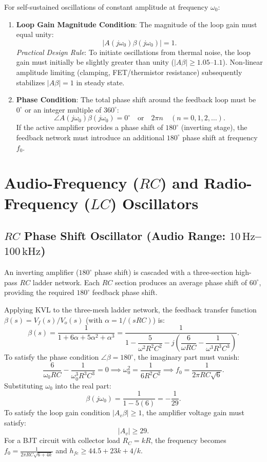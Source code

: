 \documentclass[12pt,a4paper]{article}
\begin{document}
\begin{tcolorbox}[formulabox, title={The Two Barkhausen Conditions}]
For self-sustained oscillations of constant amplitude at frequency $\omega_0$:
\begin{enumerate}[leftmargin=1.5em, itemsep=3pt]
  \item \textbf{Loop Gain Magnitude Condition}: The magnitude of the loop gain must equal unity:
  \[
  |A(j\omega_0)\beta(j\omega_0)| = 1.
  \]
  \textit{Practical Design Rule}: To initiate oscillations from thermal noise, the loop gain must initially be slightly greater than unity ($|A\beta| \ge 1.05$--$1.1$). Non-linear amplitude limiting (clamping, FET/thermistor resistance) subsequently stabilizes $|A\beta| = 1$ in steady state.
  \item \textbf{Phase Condition}: The total phase shift around the feedback loop must be $0^\circ$ or an integer multiple of $360^\circ$:
  \[
  \angle A(j\omega_0)\beta(j\omega_0) = 0^\circ \quad\text{or}\quad 2\pi n \quad (n = 0, 1, 2, \dots).
  \]
  If the active amplifier provides a phase shift of $180^\circ$ (inverting stage), the feedback network must introduce an additional $180^\circ$ phase shift at frequency $f_0$.
\end{enumerate}
\end{tcolorbox}

\section{Audio-Frequency ($RC$) and Radio-Frequency ($LC$) Oscillators}

\subsection{$RC$ Phase Shift Oscillator (Audio Range: $10\,\mathrm{Hz}$--$100\,\mathrm{kHz}$)}
An inverting amplifier ($180^\circ$ phase shift) is cascaded with a three-section high-pass $RC$ ladder network. Each $RC$ section produces an average phase shift of $60^\circ$, providing the required $180^\circ$ feedback phase shift.

\begin{tcolorbox}[formulabox, title={Derivation of $RC$ Phase Shift Oscillator Frequency}]
Applying KVL to the three-mesh ladder network, the feedback transfer function $\beta(s) = V_f(s)/V_o(s)$ (with $\alpha = 1/(sRC)$) is:
\[
\beta(s) = \frac{1}{1 + 6\alpha + 5\alpha^2 + \alpha^3} = \frac{1}{1 - \dfrac{5}{\omega^2 R^2 C^2} - j\left(\dfrac{6}{\omega R C} - \dfrac{1}{\omega^3 R^3 C^3}\right)}.
\]
To satisfy the phase condition $\angle \beta = 180^\circ$, the imaginary part must vanish:
\[
\frac{6}{\omega_0 R C} - \frac{1}{\omega_0^3 R^3 C^3} = 0 \implies \omega_0^2 = \frac{1}{6 R^2 C^2} \implies f_0 = \frac{1}{2\pi R C \sqrt{6}}.
\]
Substituting $\omega_0$ into the real part:
\[
\beta(j\omega_0) = \frac{1}{1 - 5(6)} = -\frac{1}{29}.
\]
To satisfy the loop gain condition $|A_v \beta| \ge 1$, the amplifier voltage gain must satisfy:
\[
|A_v| \ge 29.
\]
For a BJT circuit with collector load $R_C = k R$, the frequency becomes $f_0 = \frac{1}{2\pi R C \sqrt{6 + 4k}}$ and $h_{fe} \ge 44.5 + 23k + 4/k$.
\end{tcolorbox}
\end{document}
